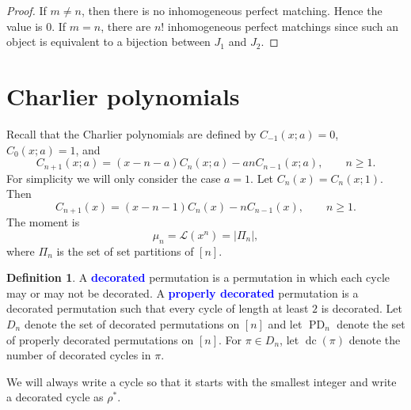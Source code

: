 \documentclass[oneside]{book}
\numberwithin{equation}{section}
\theoremstyle{definition}
\newtheorem{defn}[thm]{Definition}
\newcommand\PD{\operatorname{PD}}
\newcommand\dc{\operatorname{dc}}
\newcommand\sgn{\operatorname{sgn}}
\newcommand\sym{\mathfrak{S}}
\newcommand\LL{\mathcal{L}}
\renewcommand\emph[1]{\textcolor{blue}{\bf #1}}
\begin{document}
\begin{proof}
  If \( m\ne n \), then there is no inhomogeneous perfect matching.
  Hence the value is \( 0 \). If \( m = n \), there are \( n! \)
  inhomogeneous perfect matchings since such an object is equivalent
  to a bijection between \( J_1 \) and \( J_2 \).
\end{proof}

\section{Charlier polynomials}

Recall that the Charlier polynomials are defined by
\( C_{-1}(x;a) =0 \), \( C_{0}(x;a) =1 \), and
\[
  C_{n+1}(x;a) = (x-n-a) C_n(x;a) - an C_{n-1}(x;a), \qquad n\ge1.
\]
For simplicity we will only consider the case \( a=1 \).
Let \( C_n(x) =  C_{n}(x;1) \).
Then
\begin{equation}\label{eq:73}
  C_{n+1}(x) = (x-n-1) C_n(x) - n C_{n-1}(x), \qquad n\ge1.
\end{equation}
The moment is
\[
  \mu_n = \LL(x^n) = |\Pi_n|,
\]
where \( \Pi_n \) is the set of set partitions of \( [n] \).

\begin{defn}
  A \emph{decorated} permutation is a permutation in which each cycle
  may or may not be decorated. A \emph{properly decorated} permutation
  is a decorated permutation such that every cycle of length at least
  \( 2 \) is decorated. Let \( D_n \) denote the set of decorated
  permutations on \( [n] \) and let \( \PD_n \) denote the set of
  properly decorated permutations on \( [n] \). For \( \pi\in D_n \),
  let \( \dc(\pi) \) denote the number of decorated cycles in
  \( \pi \).
\end{defn}



We will always write a cycle so that it starts with the smallest
integer and write a decorated cycle as \( \rho^* \).
\end{document}
